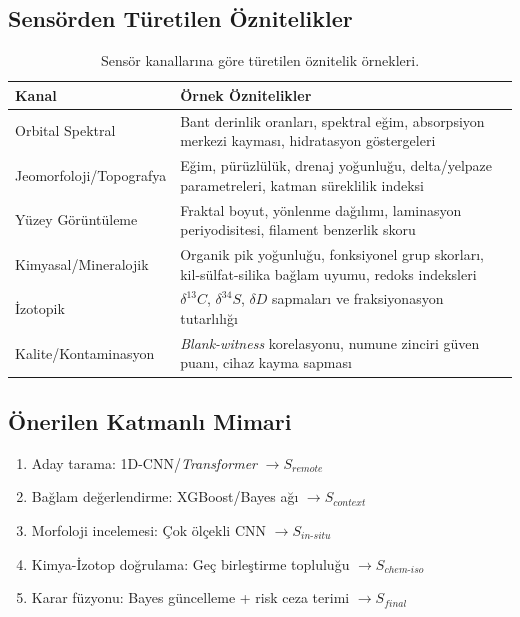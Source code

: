 \documentclass[12pt,a4paper]{article}
\begin{document}
\subsection{Sensörden Türetilen Öznitelikler}
\begin{table}[ht]
\centering
\caption{Sensör kanallarına göre türetilen öznitelik örnekleri.}
\label{tab:features}
\begin{tabular}{>{\raggedright\arraybackslash}p{} >{\raggedright\arraybackslash}p{}}
\toprule
\textbf{Kanal} & \textbf{Örnek Öznitelikler} \\
\midrule
Orbital Spektral & Bant derinlik oranları, spektral eğim, absorpsiyon merkezi kayması, hidratasyon göstergeleri \\
Jeomorfoloji/Topografya & Eğim, pürüzlülük, drenaj yoğunluğu, delta/yelpaze parametreleri, katman süreklilik indeksi \\
Yüzey Görüntüleme & Fraktal boyut, yönlenme dağılımı, laminasyon periyodisitesi, filament benzerlik skoru \\
Kimyasal/Mineralojik & Organik pik yoğunluğu, fonksiyonel grup skorları, kil-sülfat-silika bağlam uyumu, redoks indeksleri \\
İzotopik & $\delta^{13}C$, $\delta^{34}S$, $\delta D$ sapmaları ve fraksiyonasyon tutarlılığı \\
Kalite/Kontaminasyon & \textit{Blank-witness} korelasyonu, numune zinciri güven puanı, cihaz kayma sapması \\
\bottomrule
\end{tabular}
\end{table}

\subsection{Önerilen Katmanlı Mimari}
\begin{enumerate}[label=\textbf{Katman \Alph*:},leftmargin=2.6cm]
    \item Aday tarama: 1D-CNN/\textit{Transformer} $\rightarrow S_{remote}$
    \item Bağlam değerlendirme: XGBoost/Bayes ağı $\rightarrow S_{context}$
    \item Morfoloji incelemesi: Çok ölçekli CNN $\rightarrow S_{in\text{-}situ}$
    \item Kimya-İzotop doğrulama: Geç birleştirme topluluğu $\rightarrow S_{chem\text{-}iso}$
    \item Karar füzyonu: Bayes güncelleme + risk ceza terimi $\rightarrow S_{final}$
\end{enumerate}
\end{document}
